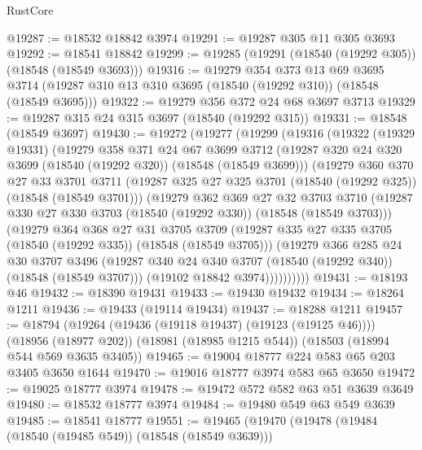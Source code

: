 \begin{lexlean}{RustCore}
\begin{coremodule}
@19287 := @18532 @18842 @3974
@19291 := @19287 @305 @11 @305 @3693
@19292 := @18541 @18842
@19299 := @19285 (@19291 (@18540 (@19292 @305)) (@18548 (@18549 @3693)))
@19316 := @19279
    @354
    @373
    @13
    @69
    @3695
    @3714
    (@19287 @310 @13 @310 @3695 (@18540 (@19292 @310)) (@18548 (@18549 @3695)))
@19322 := @19279 @356 @372 @24 @68 @3697 @3713
@19329 := @19287 @315 @24 @315 @3697 (@18540 (@19292 @315))
@19331 := @18548 (@18549 @3697)
@19430 := @19272
    (@19277
      (@19299
        (@19316
          (@19322
            (@19329 @19331)
            (@19279
              @358
              @371
              @24
              @67
              @3699
              @3712
              (@19287 @320 @24 @320 @3699 (@18540 (@19292 @320)) (@18548 (@18549 @3699)))
              (@19279
                @360
                @370
                @27
                @33
                @3701
                @3711
                (@19287 @325 @27 @325 @3701 (@18540 (@19292 @325)) (@18548 (@18549 @3701)))
                (@19279
                  @362
                  @369
                  @27
                  @32
                  @3703
                  @3710
                  (@19287 @330 @27 @330 @3703 (@18540 (@19292 @330)) (@18548 (@18549 @3703)))
                  (@19279
                    @364
                    @368
                    @27
                    @31
                    @3705
                    @3709
                    (@19287 @335 @27 @335 @3705 (@18540 (@19292 @335)) (@18548 (@18549 @3705)))
                    (@19279
                      @366
                      @285
                      @24
                      @30
                      @3707
                      @3496
                      (@19287 @340 @24 @340 @3707 (@18540 (@19292 @340)) (@18548 (@18549 @3707)))
                      (@19102 @18842 @3974))))))))))
@19431 := @18193 @46
@19432 := @18390 @19431
@19433 := @19430 @19432
@19434 := @18264 @1211
@19436 := @19433 (@19114 @19434)
@19437 := @18288 @1211
@19457 := @18794
    (@19264 (@19436 (@19118 @19437) (@19123 (@19125 @46))))
    (@18956 (@18977 @202))
    (@18981 (@18985 @1215 @544))
    (@18503 (@18994 @544 @569 @3635 @3405))
@19465 := @19004 @18777 @224 @583 @65 @203 @3405 @3650 @1644
@19470 := @19016 @18777 @3974 @583 @65 @3650
@19472 := @19025 @18777 @3974
@19478 := @19472 @572 @582 @63 @51 @3639 @3649
@19480 := @18532 @18777 @3974
@19484 := @19480 @549 @63 @549 @3639
@19485 := @18541 @18777
@19551 := @19465
    (@19470
      (@19478
        (@19484 (@18540 (@19485 @549)) (@18548 (@18549 @3639)))

\end{coremodule}
\end{lexlean}
